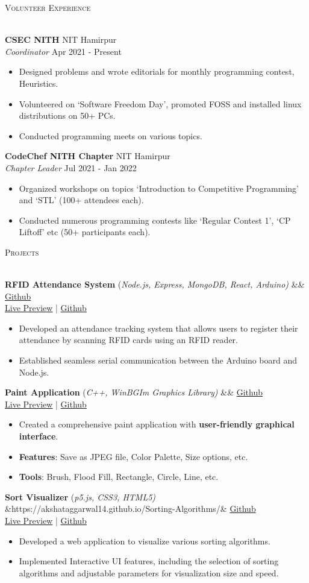 \documentclass[a4paper]{article}
\newcommand{\bulletSep} { \vspace{1.5mm} }
\newcommand{\sectionSep} { \vspace{3mm} }
\newcommand{\lineunder} {
    \vspace*{-8pt} \\
    \hspace*{-15pt} \hrulefill \\
}
\newcommand{\header} [1] {
    {\hspace*{-18pt}\vspace*{6pt} {
        \fontfamily{qcs}\selectfont \large \scshape #1
    }}
    \vspace*{-6pt} \lineunder
    \vspace{0.5mm}
}
\newcommand{\experienceItem}[5]{
    \textbf{#1} \hfill #2 \\
    \textit{#3} \hfill #4 \\
    \begin{itemize}
        #5
    \end{itemize}
}
\newcommand{\projectItem}[5]{
    {\textbf{#1}} {(\sl #2)}\hfill
    \ifx&#3&%
    \href{#4}{Github}\\
    \else
    \href{#3}{Live Preview} | \href{#4}{Github}\\
    \fi
    \begin{itemize}
        #5
    \end{itemize}
}
\begin{document}
\header{Volunteer Experience}

\experienceItem{CSEC NITH}{NIT Hamirpur}{Coordinator}{Apr 2021 - Present}{
    \item Designed problems and wrote editorials for monthly programming contest, Heuristics.
    \item Volunteered on `Software Freedom Day', promoted FOSS and installed linux distributions on 50+ PCs.
    \item Conducted programming meets on various topics.
}
\bulletSep

\experienceItem{CodeChef NITH Chapter}{NIT Hamirpur}{Chapter Leader}{Jul 2021 - Jan 2022}{
    \item Organized workshops on topics `Introduction to Competitive Programming' and `STL' (100+ attendees each).
    \item Conducted numerous programming contests like `Regular Contest 1', `CP Liftoff' etc (50+ participants each).
}
\sectionSep


\header{Projects}

\projectItem{RFID Attendance System}{Node.js, Express, MongoDB, React, Arduino}{}{https://github.com/AkshatAggarwal14/RFID-Attendance-system}{
    \item Developed an attendance tracking system that allows users to register their attendance by scanning RFID cards using an RFID reader.
    \item Established seamless serial communication between the Arduino board and Node.js.
}
\bulletSep

\projectItem{Paint Application}{C++, WinBGIm Graphics Library}{}{https://github.com/Sahil-187/Paint-Application}{
    \item Created a comprehensive paint application with \textbf{user-friendly graphical interface}.
    \item \textbf{Features}: Save as JPEG file, Color Palette, Size options, etc.
    \item \textbf{Tools}: Brush, Flood Fill, Rectangle, Circle, Line, etc.
}
\bulletSep

\projectItem{Sort Visualizer}{p5.js, CSS3, HTML5}{https://akshataggarwal14.github.io/Sorting-Algorithms/}{https://github.com/AkshatAggarwal14/Sorting-Algorithms/}{
    \item Developed a web application to visualize various sorting algorithms.
    \item Implemented Interactive UI features, including the selection of sorting algorithms and adjustable parameters for visualization size and speed.
}\bulletSep
\end{document}
